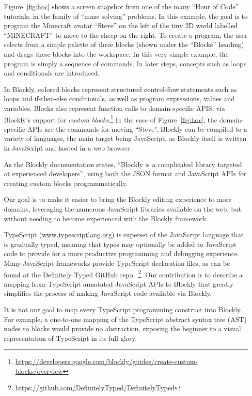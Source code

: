 Figure~\ref{fig:hoc} shows a screen snapshot from one of the many 
``Hour of Code'' tutorials, in the family of ``maze solving'' problems.
In this example, the goal is to program the Minecraft avatar ``Steve''
on the left of the tiny 2D world labelled ``MINECRAFT''
to move to the sheep on the right. To create a program,
the user selects from a simple palette of three blocks
(shown under the ``Blocks'' heading) and drags these blocks into
the workspace. In this very simple example, the
program is simply a sequence of commands. In later steps, 
concepts such as loops and conditionals are introduced.

In Blockly, colored blocks represent structured control-flow statements such as loops 
and if-then-else conditionals, as well as program expressions, values and variables. 
Blocks also represent function calls to domain-specific APIS, via Blockly's support 
for \emph{custom blocks}.\footnote{
\url{https://developers.google.com/blockly/guides/create-custom-blocks/overview}}
In the case of Figure~\ref{fig:hoc}, the domain-specific 
APIs are the commands for moving ``Steve''.
Blockly can be compiled to a variety of languages, the main target 
being JavaScript, as Blockly itself is written in JavaScript 
and hosted in a web browser.

As the Blockly documentation states, 
``Blockly is a complicated library targeted at experienced developers'',
using both the JSON format and JavaScript APIs for creating custom blocks
programmatically. 

Our goal is to make it easier to bring the Blockly editing experience to more
domains, leveraging the numerous JavaScript libraries available on the web, but
without needing to become experienced with the Blockly framework.

TypeScript (\url{www.typescriptlang.org}) is superset of the JavaScript language that is gradually typed, 
meaning that types may optionally be added to JavaScript code to provide for a more productive programming 
and debugging experience.  Many JavaScript frameworks provide TypeScript declaration files, as
can be found at the Definitely Typed GitHub repo.~\footnote{\url{https://github.com/DefinitelyTyped/DefinitelyTyped}}.
Our contribution is to describe a mapping from TypeScript annotated 
JavaScript APIs to Blockly that greatly simplifies 
the process of making JavaScript code available via Blockly.

It is not our goal to map every TypeScript programming construct into Blockly.
For example, a one-to-one mapping of the TypeScript abstract syntax tree (AST) 
nodes to blocks would provide no abstraction, exposing the beginner to a visual 
representation of TypeScript in its full glory.

